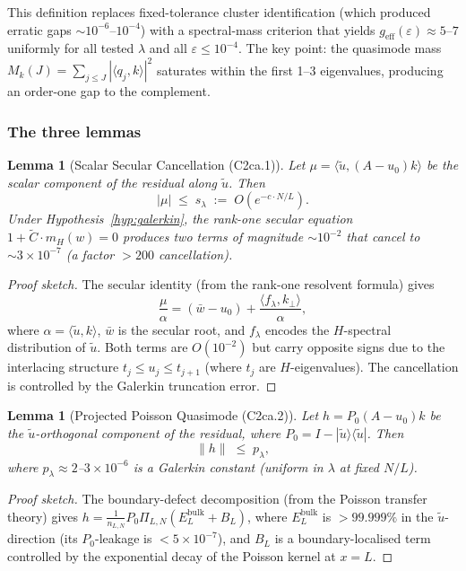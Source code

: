 \documentclass[11pt,a4paper]{article}
\theoremstyle{plain}
\newtheorem{lemma}[theorem]{Lemma}
\theoremstyle{definition}
\begin{document}
This definition replaces fixed-tolerance cluster identification
(which produced erratic gaps $\sim 10^{-6}$--$10^{-4}$) with a
spectral-mass criterion that yields $g_{\mathrm{eff}}(\varepsilon)
\approx 5$--$7$ uniformly for all tested $\lambda$ and all
$\varepsilon \leq 10^{-4}$.  The key point: the quasimode mass
$M_k(J) = \sum_{j \leq J} |\langle q_j, k\rangle|^2$ saturates
within the first 1--3 eigenvalues, producing an order-one gap to the
complement.

\subsubsection{The three lemmas}

\begin{lemma}[Scalar Secular Cancellation (C2ca.1)]
\label{lem:secular}
Let $\mu = \langle \tilde{u}, (A-u_0)k\rangle$ be the scalar
component of the residual along $\tilde{u}$.  Then
\[
  |\mu| \;\leq\; s_\lambda \;:=\; O(e^{-c \cdot N/L}).
\]
Under Hypothesis~\ref{hyp:galerkin}, the rank-one secular equation
$1 + \tilde{C} \cdot m_H(w) = 0$ produces two terms of magnitude
$\sim 10^{-2}$ that cancel to $\sim 3 \times 10^{-7}$ (a factor
$> 200$ cancellation).
\end{lemma}

\begin{proof}[Proof sketch]
The secular identity (from the rank-one resolvent formula) gives
\[
  \frac{\mu}{\alpha} = (\bar{w} - u_0)
    + \frac{\langle f_\lambda, k_\perp\rangle}{\alpha},
\]
where $\alpha = \langle\tilde{u},k\rangle$, $\bar{w}$ is the secular
root, and $f_\lambda$ encodes the $H$-spectral distribution of
$\tilde{u}$.  Both terms are $O(10^{-2})$ but carry opposite signs
due to the interlacing structure $t_j \leq u_j \leq t_{j+1}$
(where $t_j$ are $H$-eigenvalues).  The cancellation is
controlled by the Galerkin truncation error.
\end{proof}

\begin{lemma}[Projected Poisson Quasimode (C2ca.2)]
\label{lem:projected}
Let $h = P_0(A-u_0)k$ be the $\tilde{u}$-orthogonal component of
the residual, where $P_0 = I - |\tilde{u}\rangle\langle\tilde{u}|$.
Then
\[
  \|h\| \;\leq\; p_\lambda,
\]
where $p_\lambda \approx 2$--$3 \times 10^{-6}$ is a
Galerkin constant (uniform in $\lambda$ at fixed $N/L$).
\end{lemma}

\begin{proof}[Proof sketch]
The boundary-defect decomposition (from the Poisson transfer theory)
gives $h = \frac{1}{n_{L,N}} P_0 \Pi_{L,N}(E_L^{\mathrm{bulk}}
+ B_L)$, where $E_L^{\mathrm{bulk}}$ is $> 99.999\%$ in the
$\tilde{u}$-direction (its $P_0$-leakage is $< 5 \times 10^{-7}$),
and $B_L$ is a boundary-localised term controlled by the
exponential decay of the Poisson kernel at $x = L$.
\end{proof}
\end{document}

